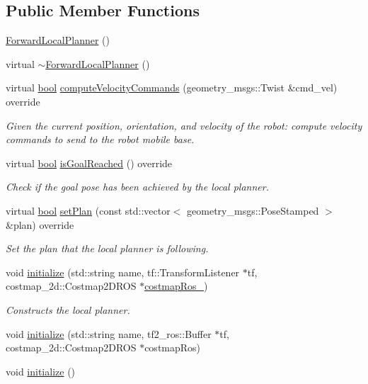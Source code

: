 \subsection*{Public Member Functions}
\begin{DoxyCompactItemize}
\item 
\hyperlink{classforward__local__planner_1_1ForwardLocalPlanner_a799b88b11a20f65c49f08090092de578}{Forward\+Local\+Planner} ()
\item 
virtual \hyperlink{classforward__local__planner_1_1ForwardLocalPlanner_ac842ee5e8465cb9038adf5596b5c4469}{$\sim$\+Forward\+Local\+Planner} ()
\item 
virtual \hyperlink{classbool}{bool} \hyperlink{classforward__local__planner_1_1ForwardLocalPlanner_af66bd75aa18afa2f027f1951dfe18b41}{compute\+Velocity\+Commands} (geometry\+\_\+msgs\+::\+Twist \&cmd\+\_\+vel) override
\begin{DoxyCompactList}\small\item\em Given the current position, orientation, and velocity of the robot\+: compute velocity commands to send to the robot mobile base. \end{DoxyCompactList}\item 
virtual \hyperlink{classbool}{bool} \hyperlink{classforward__local__planner_1_1ForwardLocalPlanner_a76d7b463fbe432b6af22d12270a1c2bd}{is\+Goal\+Reached} () override
\begin{DoxyCompactList}\small\item\em Check if the goal pose has been achieved by the local planner. \end{DoxyCompactList}\item 
virtual \hyperlink{classbool}{bool} \hyperlink{classforward__local__planner_1_1ForwardLocalPlanner_a63db153f4977a9336dc992cb92415cd7}{set\+Plan} (const std\+::vector$<$ geometry\+\_\+msgs\+::\+Pose\+Stamped $>$ \&plan) override
\begin{DoxyCompactList}\small\item\em Set the plan that the local planner is following. \end{DoxyCompactList}\item 
void \hyperlink{classforward__local__planner_1_1ForwardLocalPlanner_a0ae17e1f6fd009d1ec223135891a548a}{initialize} (std\+::string name, tf\+::\+Transform\+Listener $\ast$tf, costmap\+\_\+2d\+::\+Costmap2\+D\+R\+OS $\ast$\hyperlink{classforward__local__planner_1_1ForwardLocalPlanner_a2c232a05866edf1b71003188a03fc0c5}{costmap\+Ros\+\_\+})
\begin{DoxyCompactList}\small\item\em Constructs the local planner. \end{DoxyCompactList}\item 
void \hyperlink{classforward__local__planner_1_1ForwardLocalPlanner_a62a79a2c97359b566419731e3f2d0175}{initialize} (std\+::string name, tf2\+\_\+ros\+::\+Buffer $\ast$tf, costmap\+\_\+2d\+::\+Costmap2\+D\+R\+OS $\ast$costmap\+Ros)
\item 
void \hyperlink{classforward__local__planner_1_1ForwardLocalPlanner_a1c4b2493ff014c2539572c4c219caabf}{initialize} ()
\end{DoxyCompactItemize}
